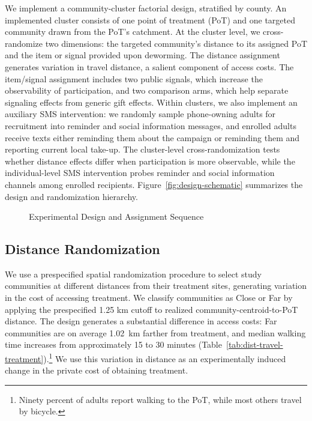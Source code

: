 \documentclass[ECM\space ReStud.tex]{subfiles}
\begin{document}
We implement a community-cluster factorial design, stratified by county. An implemented cluster consists of one point of treatment (PoT) and one targeted community drawn from the PoT's catchment. At the cluster level, we cross-randomize two dimensions: the targeted community's distance to its assigned PoT and the item or signal provided upon deworming. The distance assignment generates variation in travel distance, a salient component of access costs. The item/signal assignment includes two public signals, which increase the observability of participation, and two comparison arms, which help separate signaling effects from generic gift effects. Within clusters, we also implement an auxiliary SMS intervention: we randomly sample phone-owning adults for recruitment into reminder and social information messages, and enrolled adults receive texts either reminding them about the campaign or reminding them and reporting current local take-up. The cluster-level cross-randomization tests whether distance effects differ when participation is more observable, while the individual-level SMS intervention probes reminder and social information channels among enrolled recipients. Figure~\ref{fig:design-schematic} summarizes the design and randomization hierarchy.

\begin{figure}[H]
\centering
    \resizebox{0.86\textwidth}{!}{%

}
\caption{Experimental Design and Assignment Sequence}
\label{fig:design-schematic}
\label{fig:design-schematic-algorithm}
\end{figure}



\subsection{Distance Randomization}\label{sec:distance-treatment}

We use a prespecified spatial randomization procedure to select study communities at different distances from their treatment sites, generating variation in the cost of accessing treatment. We classify communities as Close or Far by applying the prespecified 1.25 km cutoff to realized community-centroid-to-PoT distance. The design generates a substantial difference in access costs: Far communities are on average 1.02~km farther from treatment, and median walking time increases from approximately 15 to 30 minutes
(Table~\ref{tab:dist-travel-treatment}).\footnote{Ninety percent of adults
report walking to the PoT, while most others travel by bicycle.} We use this variation in distance as an experimentally induced change in the private cost of obtaining treatment.
\end{document}
